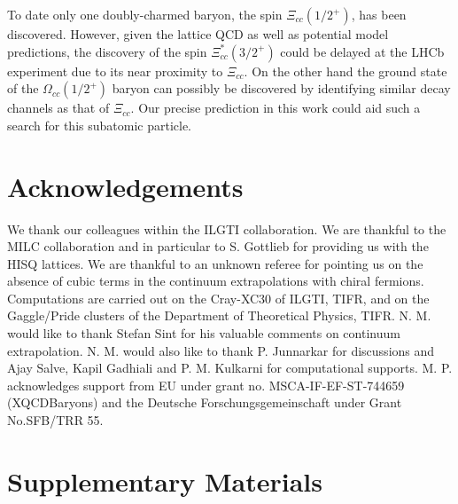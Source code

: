 \documentclass[showkeys,aps,twocolumn,showpacs,preprintnumbers,amsmath,amssymb,prl,letterpaper,floatfix,nofootinbib,superscriptaddress,]{revtex4-1}
\begin{document}
{{%

To date only one doubly-charmed baryon, the spin  $\Xi_{cc}(1/2^{+})$, has been discovered. However, given the lattice QCD as well as potential model predictions, the discovery of the spin $\Xi_{cc}^{*}(3/2^{+})$ could be delayed at the LHCb experiment due to its near proximity to  $\Xi_{cc}$. On the other hand the ground state of the $\Omega_{cc}(1/2^{+})$ baryon can possibly be discovered by identifying similar decay channels as that of $\Xi_{cc}$. Our precise prediction in this work could aid such a search for this subatomic particle.


\section{Acknowledgements} We thank our colleagues within the ILGTI collaboration.
We are thankful to the MILC collaboration 
and in particular to S. Gottlieb for providing us with the HISQ lattices. We are thankful to an unknown referee for pointing us on the absence of cubic terms in the continuum extrapolations with chiral fermions. 
Computations are carried out on the Cray-XC30 of ILGTI, TIFR, 
and on the Gaggle/Pride clusters of the Department of Theoretical Physics,
TIFR. N. M. would like to thank Stefan Sint for his valuable comments on continuum extrapolation. N. M. would also like to thank P. Junnarkar for discussions and Ajay Salve, Kapil Gadhiali and P. M. Kulkarni for computational supports. M. P. acknowledges support from EU under grant no. MSCA-IF-EF-ST-744659 (XQCDBaryons) and 
the Deutsche Forschungsgemeinschaft under Grant No.SFB/TRR 55.





\section{Supplementary Materials}
}}
\end{document}
